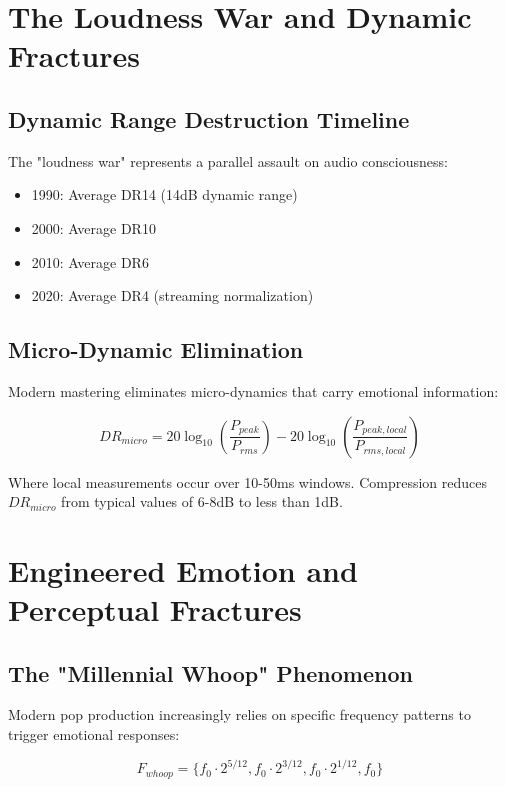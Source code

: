 \documentclass[12pt,a4paper]{article}
\begin{document}
\section{The Loudness War and Dynamic Fractures}

\subsection{Dynamic Range Destruction Timeline}

The "loudness war" represents a parallel assault on audio consciousness:

\begin{itemize}
\item 1990: Average DR14 (14dB dynamic range)
\item 2000: Average DR10
\item 2010: Average DR6
\item 2020: Average DR4 (streaming normalization)
\end{itemize}

\subsection{Micro-Dynamic Elimination}

Modern mastering eliminates micro-dynamics that carry emotional information:

\begin{equation}
DR_{micro} = 20\log_{10}\left(\frac{P_{peak}}{P_{rms}}\right) - 20\log_{10}\left(\frac{P_{peak,local}}{P_{rms,local}}\right)
\end{equation}

Where local measurements occur over 10-50ms windows. Compression reduces $DR_{micro}$ from typical values of
6-8dB to less 
than 1dB.

\newpage

\section{Engineered Emotion and Perceptual Fractures}

\subsection{The "Millennial Whoop" Phenomenon}

Modern pop production increasingly relies on specific frequency patterns to trigger emotional responses:

\begin{equation}
F_{whoop} = \{f_0 \cdot 2^{5/12}, f_0 \cdot 2^{3/12}, f_0 \cdot 2^{1/12}, f_0\}
\end{equation}
\end{document}

